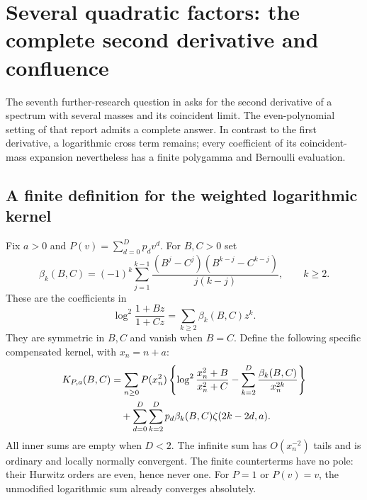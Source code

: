 \documentclass[11pt,a4paper]{article}
\numberwithin{equation}{section}
\theoremstyle{definition}
\theoremstyle{remark}
\begin{document}

\section{Several quadratic factors: the complete second derivative and confluence}
\label{mm:section}

The seventh further-research question in \cite{QSpec} asks for the
second derivative of a spectrum with several masses and its coincident
limit.  The even-polynomial setting of that report admits a complete
answer.  In contrast to the first derivative, a logarithmic cross term
remains; every coefficient of its coincident-mass expansion nevertheless
has a finite polygamma and Bernoulli evaluation.

\subsection{A finite definition for the weighted logarithmic kernel}

Fix $a>0$ and $P(v)=\sum_{d=0}^{D}p_dv^d$.  For $B,C>0$ set
\begin{equation}\label{mm:eq:beta}
 \beta_k(B,C)=(-1)^k\sum_{j=1}^{k-1}
        \frac{(B^j-C^j)(B^{k-j}-C^{k-j})}{j(k-j)},\qquad k\ge2.
\end{equation}
These are the coefficients in
\[
 \log^2\frac{1+Bz}{1+Cz}=\sum_{k\ge2}\beta_k(B,C)z^k.
\]
They are symmetric in $B,C$ and vanish when $B=C$.  Define the
following specific compensated kernel, with $x_n=n+a$:
\begin{align}
 K_{P,a}(B,C)
 &=\sum_{n\ge0}P(x_n^2)
    \left\{\log^2\frac{x_n^2+B}{x_n^2+C}
                 -\sum_{k=2}^{D}\frac{\beta_k(B,C)}{x_n^{2k}}\right\}
    \notag\\
 &\quad+\sum_{d=0}^{D}\sum_{k=2}^{D}
              p_d\beta_k(B,C)\zeta(2k-2d,a).
              \label{mm:eq:K}
\end{align}
All inner sums are empty when $D<2$.  The infinite sum has
$O(x_n^{-2})$ tails and is ordinary and locally normally convergent.
The finite counterterms have no pole: their Hurwitz orders are even,
hence never one.  For $P=1$ or $P(v)=v$, the unmodified logarithmic
sum already converges absolutely.
\end{document}
